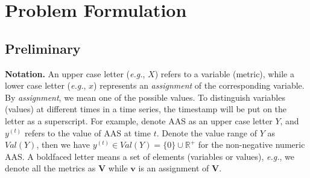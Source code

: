 \section{Problem Formulation}

\subsection{Preliminary}

\noindent \textbf{Notation.}
An upper case letter (\textit{e.g.}, $X$) refers to a variable (metric), while a lower case letter (\textit{e.g.}, $x$) represents an \textit{assignment} of the corresponding variable.
By \textit{assignment}, we mean one of the possible values. 
To distinguish variables (values) at different times in a time series, the timestamp will be put on the letter as a superscript.
For example, denote AAS as an upper case letter $Y$, and $y^{(t)}$ refers to the value of AAS at time $t$.
Denote the value range of $Y$ as $Val(Y)$, then we have $y^{(t)} \in Val(Y) = \{0\} \cup \mathbb{R}^{+}$ for the non-negative numeric AAS.
A boldfaced letter means a set of elements (variables or values), \textit{e.g.}, we denote all the metrics as $\mathbf{V}$ while $\mathbf{v}$ is an assignment of $\mathbf{V}$.


